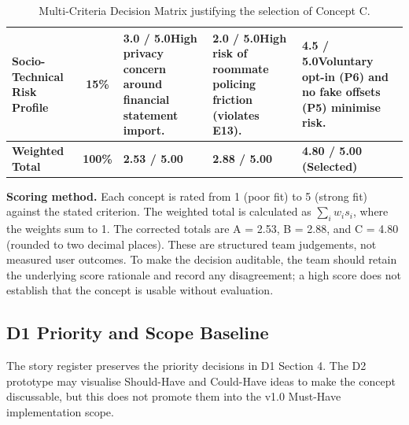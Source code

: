 \documentclass[12pt, a4paper]{article}
\begin{document}
\begin{table}[H]
\begin{tabularx}{\textwidth}{@{} >{\bfseries}p{3.0cm} c X X X @{}}
Socio-Technical Risk Profile & 15\% & \textbf{3.0 / 5.0}\newline High privacy concern around financial statement import. & \textbf{2.0 / 5.0}\newline High risk of roommate policing friction (violates E13). & \textbf{4.5 / 5.0}\newline Voluntary opt-in (P6) and no fake offsets (P5) minimise risk. \\
\midrule
\textbf{Weighted Total} & \textbf{100\%} & \textbf{2.53 / 5.00} & \textbf{2.88 / 5.00} & \textbf{4.80 / 5.00 (Selected)} \\
\bottomrule
\end{tabularx}

\caption{Multi-Criteria Decision Matrix justifying the selection of Concept C.}


\label{tab:mcdm}
\end{table}

\textbf{Scoring method.} Each concept is rated from 1 (poor fit) to 5 (strong fit) against the stated criterion. The weighted total is calculated as $\sum_i w_i s_i$, where the weights sum to 1. The corrected totals are A = 2.53, B = 2.88, and C = 4.80 (rounded to two decimal places). These are structured team judgements, not measured user outcomes. To make the decision auditable, the team should retain the underlying score rationale and record any disagreement; a high score does not establish that the concept is usable without evaluation.

\newpage


\subsection{D1 Priority and Scope Baseline}
The story register preserves the priority decisions in D1 Section 4. The D2 prototype may visualise Should-Have and Could-Have ideas to make the concept discussable, but this does not promote them into the v1.0 Must-Have implementation scope.
\end{document}
